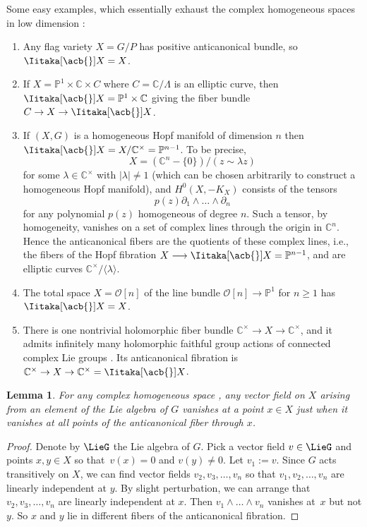 \documentclass[10pt,a4paper]{amsart}
\providecommand{\C}{}
\providecommand{\Proj}{}
\numberwithin{equation}{section}
\newtheorem{Lemma}[Theorem]{Lemma}
\renewcommand{\C}{\mathbb{C}}
\newcommand{\OO}{\mathcal{O}}
\renewcommand{\Proj}[1]{{\mathbb{P}^{#1}}}
\newcommand*{\acf}[1]{\Iitaka[\acb{}]{#1}}
\begin{document}
\begin{Example}
Some easy examples, which essentially exhaust the complex homogeneous spaces in low dimension \cite{McKay:2015}:
\begin{enumerate}\itemsep=0pt
\item[(1)]
Any flag variety $X = G/P$ has positive anticanonical bundle, so $\acf{X} = X$.
\item[(2)]
If $X = \Proj{1} \times \C \times C$ where $C = \C/\Lambda$ is an elliptic curve, then $\acf{X}
 = \Proj{1} \times \C$ giving the fiber bundle $C \to X \to \acf{X}$.
\item[(3)]
If $(X, G)$ is a homogeneous Hopf manifold of dimension $n$ then $\acf{X} = X/\C^{\times} = \Proj{n-1}$.
To be precise,
\[X = (\C^{n}-\{0\})/(z\sim\lambda z)\]
 for some $\lambda \in \C^{\times}$ with $|\lambda| \ne 1$ (which
can be chosen arbitrarily to construct a homogeneous Hopf manifold), and $H^0(X, -K_X)$ consists of the tensors
\[
p(z)\partial_1\wedge\dots\wedge\partial_n
\]
for any polynomial $p(z)$ homogeneous of degree $n$.
Such a tensor, by homogeneity, vanishes on a set of complex lines through the origin in $\C^{n}$.
Hence the anticanonical fibers are the quotients of these complex lines, i.e., the fibers of the Hopf fibration $X \longrightarrow \acf{X}
 = \Proj{n-1}$, and are elliptic curves $\C^{\times}/\langle \lambda\rangle$.
\item[(4)]
The total space $X = \OO[n]$ of the line bundle $\OO[n] \to \Proj{1}$ for $n \ge 1$ has $\acf{X} = X$.
\item[(5)]
There is one nontrivial holomorphic fiber bundle $\C^{\times} \to X \to \C^{\times}$, and it admits infinitely many holomorphic faithful group actions of connected complex Lie groups \cite{McKay:2015}.
Its anticanonical fibration is $\C^{\times} \to X \to \C^{\times} = \acf{X}$.
\end{enumerate}
\end{Example}

\begin{Lemma}\label{lemma:all.points}
For any complex homogeneous space , any vector field on $X$ arising from an element of the Lie algebra of $G$ vanishes
at a point $x \in X$ just when it vanishes at all points of the anticanonical fiber through $x$.
\end{Lemma}

\begin{proof}
Denote by $\LieG$ the Lie algebra of $G$.
Pick a vector field $v \in \LieG$ and points $x, y \in X$ so that~${v(x) = 0}$ and $v(y) \ne 0$.
Let $v_1 := v$.
Since $G$ acts transitively on $X$, we can find vector fields $v_2, v_3, \dots, v_n$ so that $v_1, v_2,
 \dots, v_n$ are linearly independent at $y$.
By slight perturbation, we can arrange that $v_2, v_3, \dots, v_n$ are linearly independent at $x$.
Then $v_1 \wedge \dots \wedge v_n$ vanishes at~$x$ but not $y$.
So $x$ and $y$ lie in different fibers of the anticanonical fibration.
\end{proof}
\end{document}
